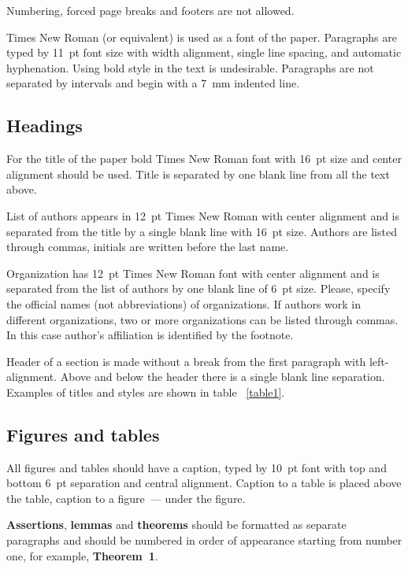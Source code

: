 \documentclass[11pt, oneside, a4paper]{article}
\begin{document}
Numbering, forced page breaks and footers are not allowed.

Times New Roman (or equivalent) is used as a font of the paper. 
Paragraphs are typed by 11~pt font size with width alignment, 
single line spacing, and automatic hyphenation. Using bold style in the text is 
undesirable. Paragraphs are not separated by intervals and begin with a 7~mm indented line.

\subsection{Headings}
For the title of the paper bold Times New Roman font with 16~pt size and center alignment should be used. 
Title is separated by one blank line from all the text above.

List of authors appears in 12~pt Times New Roman with center alignment and is 
separated from the title by a single blank line with 16~pt size. Authors are listed 
through commas, initials are written before the last name. 

Organization has 12~pt Times New Roman font with center alignment and is separated 
from the list of authors by one blank line of 6~pt size. Please, specify the official names (not abbreviations) of organizations. 
If authors work in different organizations, two or more organizations can be listed through commas. 
In this case author's affiliation is identified by the footnote.

Header of a section is made without a break from the first paragraph with left-alignment. 
Above and below the header there is a single blank line separation. 
Examples of titles and styles are shown in table ~\ref{table1}.

\subsection{Figures and tables}
All figures and tables should have a caption, typed by 10~pt font with top and bottom 6~pt 
separation and central alignment. Caption to a table is placed above the table, 
caption to a figure~--- under the figure. 

\textbf{Assertions}, \textbf{lemmas} and \textbf{theorems} should be formatted as separate paragraphs and 
should be numbered in order of appearance starting from number one, for example, \textbf{Theorem~1}.
\end{document}
